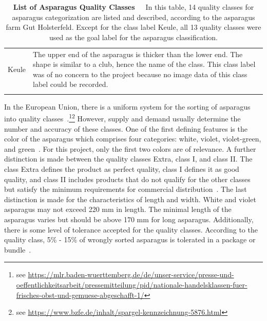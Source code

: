 \begin{table}[!ht]
{\begin{tabular}{l p{14cm}}
		\smallskip
		Keule & The upper end of the asparagus is thicker than the lower end. The shape                 is similar to a club, hence the name of the class. This class label was of no concern         to the project because no image data of this class label could be recorded. \\
		\\
		\hline
	\end{tabular}%
	}
	\caption[List of Asparagus Quality Classes]{\textbf{List of Asparagus Quality Classes}~~~In this table, 14 quality classes for asparagus categorization are listed and described, according to the asparagus farm Gut Holsterfeld. Except for the class label Keule, all 13 quality classes were used as the goal label for the asparagus classification.}
	\label{tab:AsparagusLabels}
\end{table}

In the European Union, there is a uniform system for the sorting of asparagus into quality classes~\citep{euspargelnorm,unspargelnorm}.\footnote{see \url{https://mlr.baden-wuerttemberg.de/de/unser-service/presse-und-oeffentlichkeitsarbeit/pressemitteilung/pid/nationale-handelsklassen-fuer-frisches-obst-und-gemuese-abgeschafft-1/}}\footnote{see \url{https://www.bzfe.de/inhalt/spargel-kennzeichnung-5876.html}} However, supply and demand usually determine the number and accuracy of these classes. One of the first defining features is the color of the asparagus which comprises four categories: white, violet, violet-green, and green~\citep{euspargelnorm}. For this project, only the first two colors are of relevance. A further distinction is made between the quality classes Extra, class I, and class II. The class Extra defines the product as perfect quality, class I defines it as good quality, and class II includes products that do not qualify for the other classes but satisfy the minimum requirements for commercial distribution~\citep{euspargelnorm}. The last distinction is made for the characteristics of length and width. White and violet asparagus may not exceed 220 mm in length. The minimal length of the asparagus varies but should be above 170 mm for long asparagus. Additionally, there is some level of tolerance accepted for the quality classes. According to the quality class, 5\% - 15\% of wrongly sorted asparagus is tolerated in a package or bundle~\citep{euspargelnorm}.


